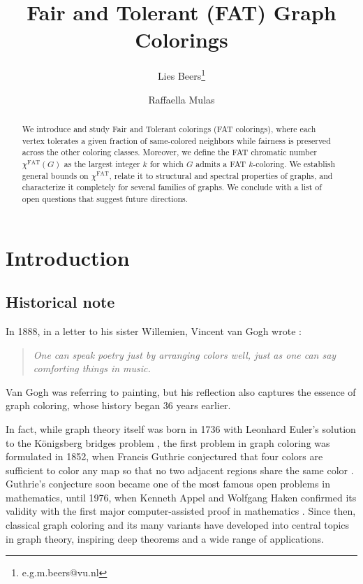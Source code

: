 \documentclass{article}
\title{Fair and Tolerant (FAT) Graph Colorings}
\author{Lies Beers\thanks{e.g.m.beers@vu.nl} }
\author{Raffaella Mulas}
\date{}
\affil{Vrije Universiteit Amsterdam}
\theoremstyle{plain}
\theoremstyle{definition}
\theoremstyle{remark}
\begin{document}
\maketitle


\begin{abstract} 
We introduce and study Fair and Tolerant colorings (FAT colorings), where each vertex tolerates a given fraction of same-colored neighbors while fairness is preserved across the other coloring classes. Moreover, we define the FAT chromatic number $\chi^{\mathrm{FAT}}(G)$ as the largest integer $k$ for which $G$ admits a FAT $k$-coloring. We establish general bounds on $\chi^{\mathrm{FAT}}$, relate it to structural and spectral properties of graphs, and characterize it completely for several families of graphs. We conclude with a list of open questions that suggest future directions.
\end{abstract}


\section{Introduction}

\subsection*{Historical note}

In 1888, in a letter to his sister Willemien, Vincent van Gogh wrote \cite{VanGogh1888}: 

\begin{quote}
        \emph{One can speak poetry just by arranging colors well, just as one can say comforting things in music.}
\end{quote}

Van Gogh was referring to painting, but his reflection also captures the essence of graph coloring, whose history began 36 years earlier. \newline 

In fact, while graph theory itself was born in 1736 with Leonhard Euler's solution to the Königsberg bridges problem \cite{Euler1736}, the first problem in graph coloring was formulated in 1852, when Francis Guthrie conjectured that four colors are sufficient to color any map so that no two adjacent regions share the same color \cite{Voloshin2009,Jensen2011,Maritz2012,Wilson2013}. Guthrie's conjecture soon became one of the most famous open problems in mathematics, until 1976, when Kenneth Appel and Wolfgang Haken confirmed its validity with the first major computer-assisted proof in mathematics \cite{Appel1977}. Since then, classical graph coloring and its many variants have developed into central topics in graph theory, inspiring deep theorems and a wide range of applications. \newline 
\end{document}
